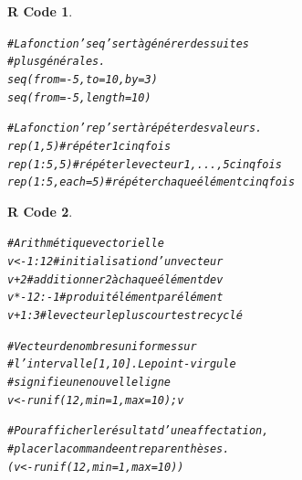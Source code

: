 \documentclass[11pt]{beamer}\usepackage[]{graphicx}\usepackage[]{color}
\makeatletter
\newcommand{\hlnum}[1]{\textcolor[rgb]{0.063,0.58,0.627}{#1}}%
\newcommand{\hlcom}[1]{\textcolor[rgb]{0.588,0.588,0.588}{#1}}%
\newcommand{\hlopt}[1]{\textcolor[rgb]{0.196,0.196,0.196}{#1}}%
\newcommand{\hlstd}[1]{\textcolor[rgb]{0.196,0.196,0.196}{#1}}%
\newcommand{\hlkwb}[1]{\textcolor[rgb]{0.627,0,0.314}{#1}}%
\newcommand{\hlkwc}[1]{\textcolor[rgb]{0,0.631,0.314}{#1}}%
\newcommand{\hlkwd}[1]{\textcolor[rgb]{0.78,0.227,0.412}{#1}}%
\newenvironment{kframe}{%
 \def\at@end@of@kframe{}%
 \ifinner\ifhmode%
  \def\at@end@of@kframe{\end{minipage}}%
  \begin{minipage}{\columnwidth}%
 \fi\fi%
 \def\FrameCommand##1{\hskip\@totalleftmargin \hskip-\fboxsep
 \colorbox{shadecolor}{##1}\hskip-\fboxsep
     \hskip-\linewidth \hskip-\@totalleftmargin \hskip\columnwidth}%
 \MakeFramed {\advance\hsize-\width
   \@totalleftmargin\z@ \linewidth\hsize
   \@setminipage}}%
 {\par\unskip\endMakeFramed%
 \at@end@of@kframe}
\newenvironment{knitrout}{}{} %
\newtheorem{rcode}{R Code}[section]
\makeatother
\begin{document}
\begin{frame}
\begin{knitrout}
\color{fgcolor}\begin{kframe}
\begin{rcode}\label{unnamed-chunk-6}\hfill{}\begin{alltt}
\hlcom{# La fonction ’seq’ sert à générer des suites }
\hlcom{# plus générales.}
\hlkwd{seq}\hlstd{(}\hlkwc{from} \hlstd{=} \hlopt{-}\hlnum{5}\hlstd{,} \hlkwc{to} \hlstd{=} \hlnum{10}\hlstd{,} \hlkwc{by} \hlstd{=} \hlnum{3}\hlstd{)}
\hlkwd{seq}\hlstd{(}\hlkwc{from} \hlstd{=} \hlopt{-}\hlnum{5}\hlstd{,} \hlkwc{length} \hlstd{=} \hlnum{10}\hlstd{)}

\hlcom{# La fonction ’rep’ sert à répéter des valeurs.}
\hlkwd{rep}\hlstd{(}\hlnum{1}\hlstd{,} \hlnum{5}\hlstd{)} \hlcom{# répéter 1 cinq fois}
\hlkwd{rep}\hlstd{(}\hlnum{1}\hlopt{:}\hlnum{5}\hlstd{,} \hlnum{5}\hlstd{)} \hlcom{# répéter le vecteur 1,...,5 cinq fois}
\hlkwd{rep}\hlstd{(}\hlnum{1}\hlopt{:}\hlnum{5}\hlstd{,} \hlkwc{each} \hlstd{=} \hlnum{5}\hlstd{)} \hlcom{# répéter chaque élément cinq fois}
\end{alltt}
\end{rcode}\end{kframe}
\end{knitrout}
\end{frame}



\begin{frame}
\begin{knitrout}
\color{fgcolor}\begin{kframe}
\begin{rcode}\label{unnamed-chunk-7}\hfill{}\begin{alltt}
\hlcom{# Arithmétique vectorielle}
\hlstd{v} \hlkwb{<-} \hlnum{1}\hlopt{:}\hlnum{12}  \hlcom{# initialisation d’un vecteur}
\hlstd{v} \hlopt{+} \hlnum{2} \hlcom{# additionner 2 à chaque élément de v}
\hlstd{v} \hlopt{* -}\hlnum{12}\hlopt{:-}\hlnum{1} \hlcom{# produit élément par élément}
\hlstd{v} \hlopt{+} \hlnum{1}\hlopt{:}\hlnum{3} \hlcom{# le vecteur le plus court est recyclé}

\hlcom{# Vecteur de nombres uniformes sur }
\hlcom{# l’intervalle [1, 10]. Le point-virgule}
\hlcom{# signifie une nouvelle ligne}
\hlstd{v} \hlkwb{<-} \hlkwd{runif}\hlstd{(}\hlnum{12}\hlstd{,} \hlkwc{min} \hlstd{=} \hlnum{1}\hlstd{,} \hlkwc{max} \hlstd{=} \hlnum{10}\hlstd{); v}

\hlcom{# Pour afficher le résultat d’une affectation,}
\hlcom{# placer la commande entre parenthèses.}
\hlstd{( v} \hlkwb{<-} \hlkwd{runif}\hlstd{(}\hlnum{12}\hlstd{,} \hlkwc{min} \hlstd{=} \hlnum{1}\hlstd{,} \hlkwc{max} \hlstd{=} \hlnum{10}\hlstd{) )}
\end{alltt}
\end{rcode}\end{kframe}
\end{knitrout}
\end{frame}
\end{document}
